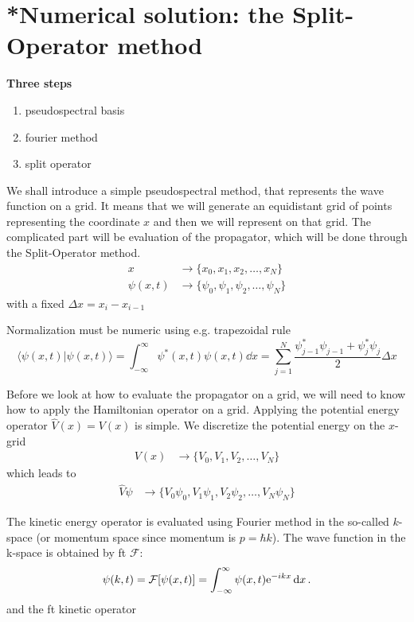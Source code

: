 \section{*Numerical solution: the Split-Operator method}
\textbf{Three steps}
\begin{enumerate}
    \item pseudospectral basis
    \item fourier method
    \item split operator
\end{enumerate}

We shall introduce a simple pseudospectral method, that represents the wave function on a grid. It means that we will generate an equidistant grid of points representing the coordinate $x$ and then we will represent on that grid. The complicated part will be evaluation of the propagator, which will be done through the Split-Operator method.
\begin{align}
    x &\rightarrow \{x_0, x_1, x_2, \dots, x_N\} \\
    \psi(x,t) &\rightarrow \{\psi_0, \psi_1, \psi_2, \dots, \psi_N\}
\end{align}
with a fixed $\Delta x = x_i - x_{i-1}$

Normalization must be numeric using e.g. trapezoidal rule
\begin{equation}
    \langle \psi(x,t) | \psi(x,t) \rangle = \int_{-\infty}^\infty \psi^*(x,t)\psi(x,t) \dd x = \sum_{j=1}^N \frac{\psi^*_{j-1}\psi_{j-1} + \psi^*_{j}\psi_{j}}{2} \Delta x
\end{equation}

Before we look at how to evaluate the propagator on a grid, we will need to know how to apply the Hamiltonian operator on a grid. Applying the potential energy operator $\hat{V}(x) = V(x)$ is simple. We discretize the potential energy on the $x$-grid
\begin{align}
    V(x) &\rightarrow \{V_0, V_1, V_2, \dots, V_N\}
\end{align}
which leads to 
\begin{align}
    \hat{V}\psi &\rightarrow \{V_0 \psi_0, V_1 \psi_1, V_2 \psi_2, \dots, V_N \psi_N\}
\end{align}

The kinetic energy operator is evaluated using Fourier method in the so-called $k$-space (or momentum space since momentum is $p=\hbar k$). The wave function in the k-space is obtained by \acrfull{ft} $\mathcal{F}$:
\begin{align}
    \psi(k,t) = \mathcal{F}[\psi(x,t)] =\int_{-\infty}^\infty \psi(x,t) \mathrm{e}^{-ikx}\mathop{}\!\mathrm{d} x \, .
\end{align}
and the \acrshort{ft} kinetic operator 

